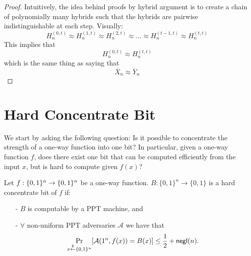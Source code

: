 \begin{proof}
Intuitively, the idea behind proofs by hybrid argument is to create a chain of polynomially many hybrids such that the hybrids are pairwise indistinguishable at each step.
Visually:
$$H^{(0,t)}_n \approx H^{(1,t)}_n \approx H^{(2,t)}_n \approx ... \approx H^{(t-1,t)}_n \approx H^{(t,t)}_n$$
This implies that 
$$H^{(0,t)}_n \approx H^{(t,t)}_n$$
which is the same thing as saying that
$$\overline{X}_n \approx \overline{Y}_n$$


%
%
\end{proof}


\iffalse
\section{Hard Concentrate Bit}
We start by asking the following question: Is it possible to concentrate the strength of a one-way function into one bit? In particular, given a one-way function $f$, does there exist one bit that can be computed efficiently from the input $x$, but is hard to compute given $f(x)$?
\begin{definition}
Let $f:\{0,1\}^{n} \rightarrow \{0,1\}^{n}$ be a one-way function.
$B:\{0,1\}^n \rightarrow \{0,1\}$ is a hard concentrate bit of $f$ if:
\begin{itemize}
\item[-] $B$ is computable by a PPT machine, and
\item[-] $\forall$ non-uniform PPT adversaries $\mathcal{A}$ we have that
	$$\Pr_{x\stackrel{\$}{\leftarrow} \{0,1\}^{n}}[\mathcal{A}(1^n, f(x)) = B(x)] \leq \frac{1}{2} + \mathsf{negl}(n).$$
\end{itemize}
\end{definition}

